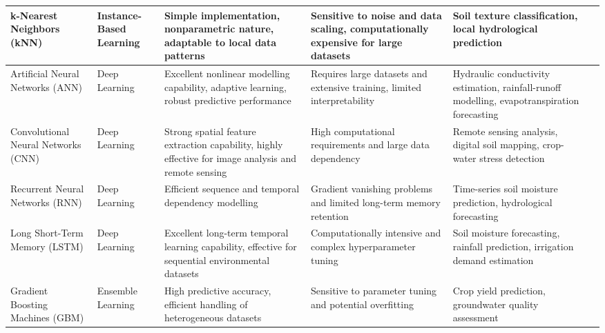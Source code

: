 \documentclass[land,article,submit,pdftex,moreauthors]{Definitions/mdpi}
\numberwithin{equation}{section}
\begin{document}
\begin{longtable}{p{1.4cm} p{1.3cm} p{2.6cm} p{2.6cm} p{2.6cm} p{2.3cm}}
k-Nearest Neighbors (kNN) &
Instance-Based Learning &
Simple implementation, nonparametric nature, adaptable to local data patterns &
Sensitive to noise and data scaling, computationally expensive for large datasets &
Soil texture classification, local hydrological prediction &
\citep{Cover1967, Altman1992, Nematollahi2020, Elshorbagy2010, Fix1989} \\ \hline

Artificial Neural Networks (ANN) &
Deep Learning &
Excellent nonlinear modelling capability, adaptive learning, robust predictive performance &
Requires large datasets and extensive training, limited interpretability &
Hydraulic conductivity estimation, rainfall-runoff modelling, evapotranspiration forecasting &
\citep{Hornik1989, Maier2000, Govindaraju2000, ASCE2000, Dawson2001} \\ \hline

Convolutional Neural Networks (CNN) &
Deep Learning &
Strong spatial feature extraction capability, highly effective for image analysis and remote sensing &
High computational requirements and large data dependency &
Remote sensing analysis, digital soil mapping, crop-water stress detection &
\citep{LeCun2015, Padarian2019, Zhang2018_CNN, Krizhevsky2012, Ng2019} \\ \hline

Recurrent Neural Networks (RNN) &
Deep Learning &
Efficient sequence and temporal dependency modelling &
Gradient vanishing problems and limited long-term memory retention &
Time-series soil moisture prediction, hydrological forecasting &
\citep{Jordan1986, Elman1990, Coulibaly2001, Chiang2004, Medsker2001} \\ \hline

Long Short-Term Memory (LSTM) &
Deep Learning &
Excellent long-term temporal learning capability, effective for sequential environmental datasets &
Computationally intensive and complex hyperparameter tuning &
Soil moisture forecasting, rainfall prediction, irrigation demand estimation &
\citep{Hochreiter1997, Kratzert2018, Fang2017, Zhang2019_LSTM, Babaeian2021} \\ \hline

Gradient Boosting Machines (GBM) &
Ensemble Learning &
High predictive accuracy, efficient handling of heterogeneous datasets &
Sensitive to parameter tuning and potential overfitting &
Crop yield prediction, groundwater quality assessment &
\citep{Friedman2001, Natekin2013, Elith2008, Persson2024, Parsa2021} \\ \hline


\end{longtable}
\end{document}
